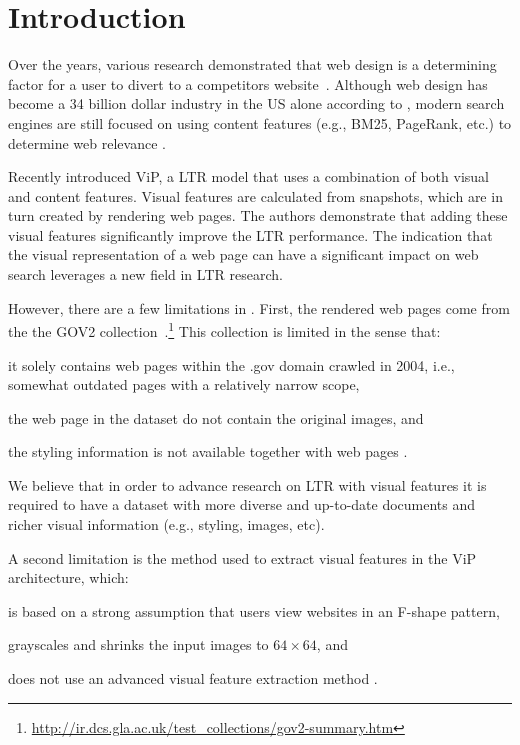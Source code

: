 
\section{Introduction}
Over the years, various research demonstrated that web design is a determining factor for a user to divert to a competitors website~\cite{nielsen1999designing,nielsen2006f,pernice2017f,wang2014eye}.
Although web design has become a 34 billion dollar industry in the US alone according to \citet{ibisdesign}, modern search engines are still focused on using content features (e.g., BM25, PageRank, etc.) to determine web relevance . 

Recently \citet{fan2017learning} introduced ViP, a \ac{LTR} model that uses a combination of both visual and content features.
Visual features are calculated from snapshots, which are in turn created by rendering web pages.
The authors demonstrate that adding these visual features significantly improve the \ac{LTR} performance.
The indication that the visual representation of a web page can have a significant impact on web search leverages a new field in \ac{LTR} research.

However, there are a few limitations in \cite{fan2017learning}.
First, the rendered web pages come from the the GOV2 collection~.\footnote{\url{http://ir.dcs.gla.ac.uk/test_collections/gov2-summary.htm}}
This collection is limited in the sense that:
\begin{inparaenum}[(i)]
\item it solely contains web pages within the .gov domain crawled in 2004, i.e., somewhat outdated pages with a relatively narrow scope,
\item the web page in the dataset do not contain the original images, and
\item the styling information is not available together with web pages .
\end{inparaenum}
We believe that in order to advance research on \ac{LTR} with visual features it is required to have a dataset with more diverse and up-to-date documents and richer visual information (e.g., styling, images, etc).

A second limitation is the method used to extract visual features in the ViP architecture, which: 
\begin{inparaenum}[(i)]
\item is based on a strong assumption that users view websites in an F-shape pattern, 
\item grayscales and shrinks the input images to $64\times64$, and
\item does not use an advanced visual feature extraction method .
\end{inparaenum}

